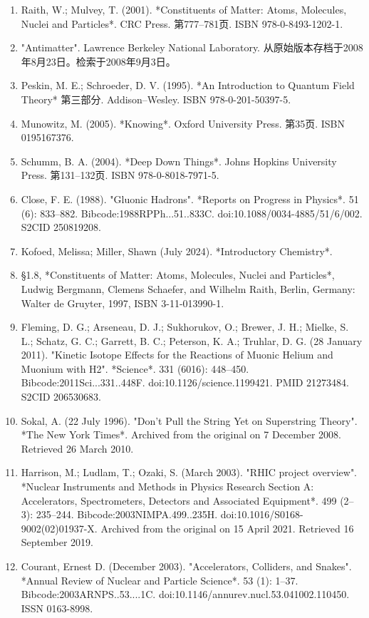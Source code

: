 \begin{enumerate}
\item Raith, W.; Mulvey, T. (2001). *Constituents of Matter: Atoms, Molecules, Nuclei and Particles*. CRC Press. 第777–781页. ISBN 978-0-8493-1202-1.
\item "Antimatter". Lawrence Berkeley National Laboratory. 从原始版本存档于2008年8月23日。检索于2008年9月3日。
\item Peskin, M. E.; Schroeder, D. V. (1995). *An Introduction to Quantum Field Theory* 第三部分. Addison–Wesley. ISBN 978-0-201-50397-5.
\item Munowitz, M. (2005). *Knowing*. Oxford University Press. 第35页. ISBN 0195167376.
\item Schumm, B. A. (2004). *Deep Down Things*. Johns Hopkins University Press. 第131–132页. ISBN 978-0-8018-7971-5.
\item Close, F. E. (1988). "Gluonic Hadrons". *Reports on Progress in Physics*. 51 (6): 833–882. Bibcode:1988RPPh...51..833C. doi:10.1088/0034-4885/51/6/002. S2CID 250819208.
\item Kofoed, Melissa; Miller, Shawn (July 2024). *Introductory Chemistry*.
\item §1.8, *Constituents of Matter: Atoms, Molecules, Nuclei and Particles*, Ludwig Bergmann, Clemens Schaefer, and Wilhelm Raith, Berlin, Germany: Walter de Gruyter, 1997, ISBN 3-11-013990-1.
\item Fleming, D. G.; Arseneau, D. J.; Sukhorukov, O.; Brewer, J. H.; Mielke, S. L.; Schatz, G. C.; Garrett, B. C.; Peterson, K. A.; Truhlar, D. G. (28 January 2011). "Kinetic Isotope Effects for the Reactions of Muonic Helium and Muonium with H2". *Science*. 331 (6016): 448–450. Bibcode:2011Sci...331..448F. doi:10.1126/science.1199421. PMID 21273484. S2CID 206530683.
\item Sokal, A. (22 July 1996). "Don't Pull the String Yet on Superstring Theory". *The New York Times*. Archived from the original on 7 December 2008. Retrieved 26 March 2010.
\item Harrison, M.; Ludlam, T.; Ozaki, S. (March 2003). "RHIC project overview". *Nuclear Instruments and Methods in Physics Research Section A: Accelerators, Spectrometers, Detectors and Associated Equipment*. 499 (2–3): 235–244. Bibcode:2003NIMPA.499..235H. doi:10.1016/S0168-9002(02)01937-X. Archived from the original on 15 April 2021. Retrieved 16 September 2019.
\item Courant, Ernest D. (December 2003). "Accelerators, Colliders, and Snakes". *Annual Review of Nuclear and Particle Science*. 53 (1): 1–37. Bibcode:2003ARNPS..53....1C. doi:10.1146/annurev.nucl.53.041002.110450. ISSN 0163-8998.
\end{enumerate}